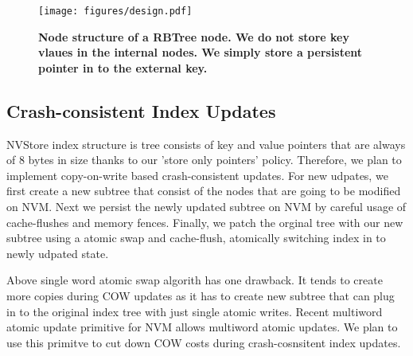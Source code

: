\begin{figure}[]   
	\centering
	\texttt{[image: figures/design.pdf]} 
	\caption{\bf Node structure of a RBTree node. We do not store key vlaues in the internal nodes. We simply
	store a persistent pointer in to the external key.} 
	\label{fig:zerocopy} 
\end{figure}

\subsection{Crash-consistent Index Updates}
NVStore index structure is tree consists of key and value pointers that are always of 8 bytes in size
thanks to our 'store only pointers' policy. Therefore, we plan to implement copy-on-write based 
crash-consistent updates. For new udpates, we first create a new subtree that consist of the nodes
that are going to be modified on NVM. Next we persist the newly updated subtree on NVM by careful
usage of cache-flushes and memory fences. Finally, we patch the orginal tree with our new subtree
using a atomic swap and cache-flush, atomically switching index in to newly udpated state.

Above single word atomic swap algorith has one drawback. It tends to create more copies during
COW updates as it has to create new subtree that can plug in to the original index tree with just 
single atomic writes. Recent multiword atomic update primitive\cite{pmwcas} for NVM allows multiword 
atomic updates. We plan to use this primitve to cut down COW costs during crash-cosnsitent index updates.




